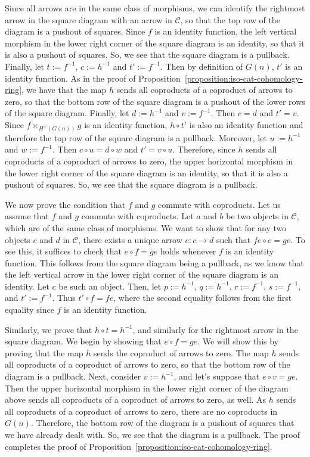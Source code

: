 \documentclass[a4paper,reqno,oneside]{article}
\begin{document}
Since all arrows are in the same class of morphisms, we can identify the rightmost arrow in the square diagram with an arrow in $\mathcal{C}$, so that the top row of the diagram is a pushout of squares. Since $f$ is an identity function, the left vertical morphism in the lower right corner of the square diagram is an identity, so that it is also a pushout of squares. So, we see that the square diagram is a pullback. Finally, let $t := f^{-1}$, $c := h^{-1}$ and $t' := f^{-1}$. Then by definition of $G(n)$, $t'$ is an identity function. As in the proof of Proposition~\ref{proposition:iso-cat-cohomology-ring}, we have that the map $h$ sends all coproducts of a coproduct of arrows to zero, so that the bottom row of the square diagram is a pushout of the lower rows of the square diagram. Finally, let $d := h^{-1}$ and $v := f^{-1}$. Then $c = d$ and $t' = v$. Since $f \times_{H^{\times}(G(n))} g$ is an identity function, $h \circ t'$ is also an identity function and therefore the top row of the square diagram is a pullback. Moreover, let $u := h^{-1}$ and $w := f^{-1}$. Then $c \circ u = d \circ w$ and $t' = v \circ u$. Therefore, since $h$ sends all coproducts of a coproduct of arrows to zero, the upper horizontal morphism in the lower right corner of the square diagram is an identity, so that it is also a pushout of squares. So, we see that the square diagram is a pullback.

We now prove the condition that $f$ and $g$ commute with coproducts. Let us assume that $f$ and $g$ commute with coproducts. Let $a$ and $b$ be two objects in $\mathcal{C}$, which are of the same class of morphisms. We want to show that for any two objects $c$ and $d$ in $\mathcal{C}$, there exists a unique arrow $e: c \rightarrow d$ such that $fe \circ e = ge$. To see this, it suffices to check that $e \circ f = ge$ holds whenever $f$ is an identity function. This follows from the square diagram being a pullback, as we know that the left vertical arrow in the lower right corner of the square diagram is an identity. Let $c$ be such an object. Then, let $p := h^{-1}$, $q := h^{-1}$, $r := f^{-1}$, $s := f^{-1}$, and $t' := f^{-1}$. Thus $t' \circ f = fe$, where the second equality follows from the first equality since $f$ is an identity function.

Similarly, we prove that $h \circ t = h^{-1}$, and similarly for the rightmost arrow in the square diagram. We begin by showing that $e \circ f = ge$. We will show this by proving that the map $h$ sends the coproduct of arrows to zero. The map $h$ sends all coproducts of a coproduct of arrows to zero, so that the bottom row of the diagram is a pullback. Next, consider $v := h^{-1}$, and let's suppose that $e \circ v = ge$. Then the upper horizontal morphism in the lower right corner of the diagram above sends all coproducts of a coproduct of arrows to zero, as well. As $h$ sends all coproducts of a coproduct of arrows to zero, there are no coproducts in $G(n)$. Therefore, the bottom row of the diagram is a pushout of squares that we have already dealt with. So, we see that the diagram is a pullback. The proof completes the proof of Proposition~\ref{proposition:iso-cat-cohomology-ring}.
\end{document}
